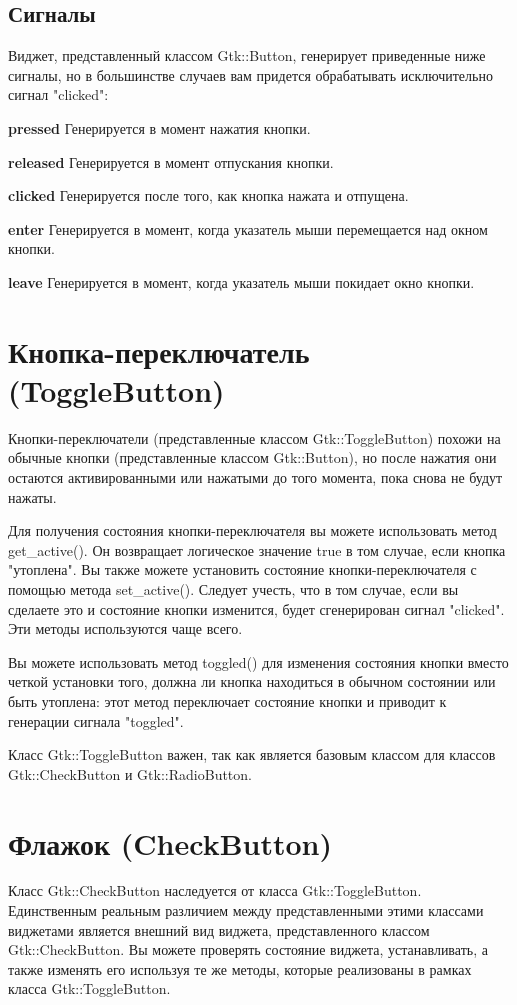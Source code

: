 \subsection{Сигналы}
Виджет, представленный классом Gtk::Button, генерирует приведенные ниже сигналы, но в большинстве случаев вам придется обрабатывать исключительно сигнал "clicked":

{\bfseries pressed}
Генерируется в момент нажатия кнопки. 

{\bfseries released}
Генерируется в момент отпускания кнопки. 

{\bfseries clicked}
Генерируется после того, как кнопка нажата и отпущена. 

{\bfseries enter}
Генерируется в момент, когда указатель мыши перемещается над окном кнопки. 

{\bfseries leave}
Генерируется в момент, когда указатель мыши покидает окно кнопки. 

\section{Кнопка-переключатель (ToggleButton)}
 Кнопки-переключатели (представленные классом Gtk::ToggleButton) похожи на обычные кнопки (представленные классом Gtk::Button), но после нажатия они остаются активированными или нажатыми до того момента, пока снова не будут нажаты.

Для получения состояния кнопки-переключателя вы можете использовать метод get\_active(). Он возвращает логическое значение true в том случае, если кнопка "утоплена". Вы также можете установить состояние кнопки-переключателя с помощью метода set\_active(). Следует учесть, что в том случае, если вы сделаете это и состояние кнопки изменится, будет сгенерирован сигнал "clicked". Эти методы используются чаще всего.

Вы можете использовать метод toggled() для изменения состояния кнопки вместо четкой установки того, должна ли кнопка находиться в обычном состоянии или быть утоплена: этот метод переключает состояние кнопки и приводит к генерации сигнала "toggled".

Класс Gtk::ToggleButton важен, так как является базовым классом для классов Gtk::CheckButton и Gtk::RadioButton. 

\section{Флажок (CheckButton)}
Класс Gtk::CheckButton наследуется от класса Gtk::ToggleButton. Единственным реальным различием между представленными этими классами виджетами является внешний вид виджета, представленного классом Gtk::CheckButton. Вы можете проверять состояние виджета, устанавливать, а также изменять его используя те же методы, которые реализованы в рамках класса Gtk::ToggleButton. 

